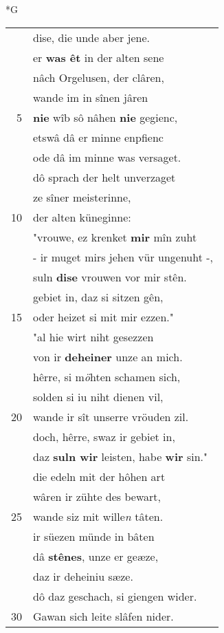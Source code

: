 \documentclass[8pt,a4paper,notitlepage]{article}
\begin{document}
\begin{table}[ht]
\begin{minipage}[t]{0.5\linewidth}
\small
\begin{center}*G
\end{center}
\begin{tabular}{rl}
 & dise, die unde aber jene.\\ 
 & er \textbf{was êt} in der alten sene\\ 
 & nâch Orgelusen, der clâren,\\ 
 & wande im in sînen jâren\\ 
5 & \textbf{nie} wîb sô nâhen \textbf{nie} gegienc,\\ 
 & etswâ dâ er minne enpfienc\\ 
 & ode dâ im minne was versaget.\\ 
 & dô sprach der helt unverzaget\\ 
 & ze sîner meisterinne,\\ 
10 & der alten küneginne:\\ 
 & "vrouwe, ez krenket \textbf{mir} mîn zuht\\ 
 & - ir muget mirs jehen vür ungenuht -,\\ 
 & suln \textbf{dise} vrouwen vor mir stên.\\ 
 & gebiet in, daz si sitzen gên,\\ 
15 & oder heizet si mit mir ezzen."\\ 
 & "al hie wirt niht gesezzen\\ 
 & von ir \textbf{deheiner} unze an mich.\\ 
 & hêrre, si m\textit{ö}hten schamen sich,\\ 
 & solden si iu niht dienen vil,\\ 
20 & wande ir sît unserre vröuden zil.\\ 
 & doch, hêrre, swaz ir gebiet in,\\ 
 & daz \textbf{suln wir} leisten, habe \textbf{wir} sin."\\ 
 & die edeln mit der hôhen art\\ 
 & wâren ir zühte des bewart,\\ 
25 & wande siz mit wille\textit{n} tâten.\\ 
 & ir süezen münde in bâten\\ 
 & dâ \textbf{stênes}, unze er geæze,\\ 
 & daz ir deheiniu sæze.\\ 
 & dô daz geschach, si giengen wider.\\ 
30 & Gawan sich leite slâfen nider.\\ 

\end{tabular}
\end{minipage}
\end{table}
\end{document}
